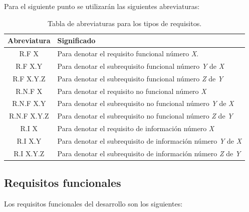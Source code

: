 Para el siguiente punto se utilizarán las siguientes abreviaturas:\\
\renewcommand{\arraystretch}{1.5}
\begin{table}[H]
   \centering
   \label{tabla-abreviaturas}
   \begin{tabular}{|c|l|}
   \hline
   \textbf{Abreviatura} & \textbf{Significado} \\ \hline
   R.F X       & Para denotar el requisito funcional número \textit{X}.\\ \hline
   R.F X.Y     & Para denotar el subrequisito funcional número \textit{Y} de \textit{X}\\ \hline
   R.F X.Y.Z   & Para denotar el subrequisito funcional número \textit{Z} de \textit{Y}\\ \hline
   R.N.F X     & Para denotar el requisito no funcional número \textit{X}\\ \hline
   R.N.F X.Y   & Para denotar el subrequisito no funcional número \textit{Y} de \textit{X}\\ \hline
   R.N.F X.Y.Z & Para denotar el subrequisito no funcional número \textit{Z} de \textit{Y}\\ \hline
   R.I X       & Para denotar el requisito de información número \textit{X}\\ \hline
   R.I X.Y     & Para denotar el subrequisito de información número \textit{Y} de \textit{X}\\ \hline
   R.I X.Y.Z   & Para denotar el subrequisito de información número \textit{Z} de \textit{Y}\\ \hline
   \end{tabular}
   \caption{Tabla de abreviaturas para los tipos de requisitos.}
\end{table}


\subsection{Requisitos funcionales}
Los requisitos funcionales del desarrollo son los siguientes: 

